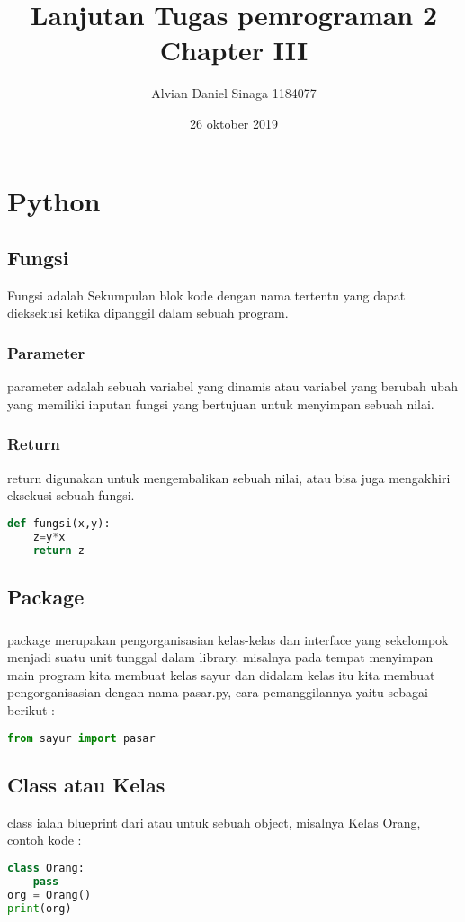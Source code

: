 \documentclass[a4paper,12pt]{report}
\title{Lanjutan Tugas pemrograman 2 Chapter III}
\author{Alvian Daniel Sinaga 1184077}
\date{26 oktober 2019}
\begin{document}
\maketitle
\chapter{Python}
\section{Fungsi}
Fungsi adalah Sekumpulan blok kode dengan nama tertentu yang dapat dieksekusi ketika dipanggil dalam sebuah program.
\subsection*{Parameter}
parameter adalah sebuah variabel yang dinamis atau variabel yang berubah ubah yang memiliki inputan fungsi yang bertujuan untuk menyimpan sebuah nilai.
\subsection*{Return}
return digunakan untuk mengembalikan sebuah nilai, atau bisa juga mengakhiri eksekusi sebuah fungsi.
\begin{lstlisting}[language=Python]
def fungsi(x,y):
	z=y*x
	return z
\end{lstlisting}
\section{Package}
\paragraph{}
package merupakan pengorganisasian kelas-kelas dan interface yang sekelompok menjadi suatu unit tunggal dalam library. misalnya pada tempat menyimpan main program kita membuat kelas sayur dan didalam kelas itu kita membuat pengorganisasian dengan nama pasar.py, cara pemanggilannya yaitu sebagai berikut :
\begin{lstlisting}[language=Python]
from sayur import pasar
\end{lstlisting}
\section{Class atau Kelas}
class ialah blueprint dari atau untuk sebuah object, misalnya Kelas Orang, contoh kode :
\begin{lstlisting}[language=Python]
class Orang:
    pass
org = Orang()
print(org)
\end{lstlisting}
\end{document}
